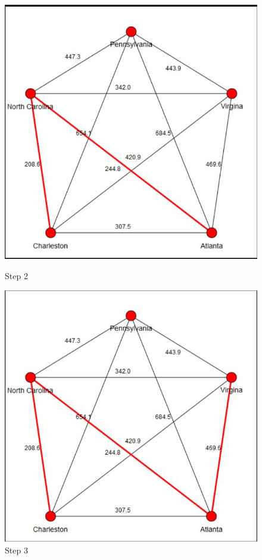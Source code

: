 \documentclass[a4paper,11pt]{scrartcl}
\begin{document}
\begin{figure}[h!]
  \centering
  \begin{minipage}[b]{0.4\textwidth}
    \includegraphics[width=\textwidth]{Step2}
    \caption{Step 2}
  \end{minipage}
  \hfill
  \begin{minipage}[b]{0.4\textwidth}
    \includegraphics[width=\textwidth]{Step3}
    \caption{Step 3}
  \end{minipage}
\end{figure}
\end{document}
